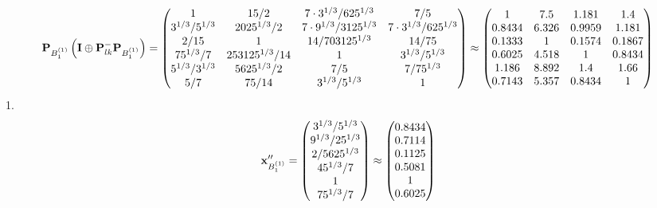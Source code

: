 \documentclass[10pt,a4paper]{article}
\begin{document}
	\[
		\bold{P}_{B_1^{(1)}}\left(\bold{I} \oplus \bold{P}_{lk}^{-}\bold{P}_{B_1^{(1)}}\right) = 
		\begin{pmatrix}
			{1}{} & {{15}} / {{2}} & {{7} \cdot {3^ {1 / 3}}} / {{625^ {1 / 3}}} & {{7}} / {{5}} \\
			{{3^ {1 / 3}}} / {{5^ {1 / 3}}} & {{2025^ {1 / 3}}} / {{2}} & {{7} \cdot {9^ {1 / 3}}} / {{3125^ {1 / 3}}} & {{7} \cdot {3^ {1 / 3}}} / {{625^ {1 / 3}}} \\
			{{2}} / {{15}} & {1}{} & {{14}} / {{703125^ {1 / 3}}} & {{14}} / {{75}} \\
			{{75^ {1 / 3}}} / {{7}} & {{253125^ {1 / 3}}} / {{14}} & {1}{} & {{3^ {1 / 3}}} / {{5^ {1 / 3}}} \\
			{{5^ {1 / 3}}} / {{3^ {1 / 3}}} & {{5625^ {1 / 3}}} / {{2}} & {{7}} / {{5}} & {{7}} / {{75^ {1 / 3}}} \\
			{{5}} / {{7}} & {{75}} / {{14}} & {{3^ {1 / 3}}} / {{5^ {1 / 3}}} & {1}{} \\
		\end{pmatrix}
		\approx
		\begin{pmatrix}
			1        & 7.5      & 1.181    & 1.4      \\
			0.8434   & 6.326    & 0.9959   & 1.181    \\
			0.1333   & 1        & 0.1574   & 0.1867   \\
			0.6025   & 4.518    & 1        & 0.8434   \\
			1.186    & 8.892    & 1.4      & 1.66     \\
			0.7143   & 5.357    & 0.8434   & 1        \\
		\end{pmatrix}
	\]
	1.
	\[
		\bold{x}''_{B_1^{(1)}} = 
		\begin{pmatrix}
			{{3^ {1 / 3}}} / {{5^ {1 / 3}}} \\
			{{9^ {1 / 3}}} / {{25^ {1 / 3}}} \\
			{{2}} / {{5625^ {1 / 3}}} \\
			{{45^ {1 / 3}}} / {{7}} \\
			{1}{} \\
			{{75^ {1 / 3}}} / {{7}} \\
		\end{pmatrix}
		\approx
		\begin{pmatrix}
			0.8434   \\
			0.7114   \\
			0.1125   \\
			0.5081   \\
			1        \\
			0.6025   \\
		\end{pmatrix}
	\]
\end{document}
